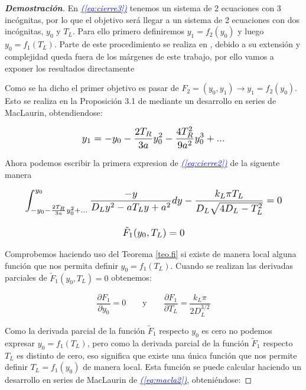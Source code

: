 \documentclass[12pt,a4paper]{report} %
\newcommand{\eref}[1]{\hyperref[#1]{\textcolor{blue}{\textit{(\ref*{#1})}}}}
\begin{document}
\begin{proof}[\textbf{Demostración}]
	\newpage
	
	\vspace{0.5cm}\noindent En \eref{eq:cierre3} tenemos un sistema de 2 ecuaciones con 3 incógnitas, por lo que el objetivo será llegar a un sistema de 2 ecuaciones con dos incógnitas, $y_0$ y $T_L$. Para ello primero definiremos $y_1=f_2(y_0)$ y luego $y_0=f_1(T_L)$. Parte de este procedimiento se realiza en \cite{properties}, debido a su extensión y complejidad queda fuera de los márgenes de este trabajo, por ello vamos a exponer los resultados directamente 
	
	\vspace{0.5cm}Como se ha dicho el primer objetivo es pasar de $F_2=(y_0,y_1) \longrightarrow y_1=f_2(y_0)$. Esto se realiza en la Proposición 3.1 de \cite{properties} mediante un desarrollo en series de MacLaurin, obtendiendose:
	
		\begin{equation}
		\label{eq:macla}
		\scalebox{1.2}{$\displaystyle
			y_1=-y_0-\frac{2T_R}{3a}y_0^2-\frac{4T_R^2}{9a^2}y_0^3+...
			$}
	\end{equation}\smallskip
	
	\vspace{0.5cm}\noindent Ahora podemos escribir la primera expresion de \eref{eq:cierre2} de la siguente manera
	
	\begin{equation}
		\label{eq:macla2}
		\scalebox{1.2}{$\displaystyle
			\begin{gathered}
				\int_{-y_0-\frac{2T_R}{3a}y_0^2+...}^{y_0}\frac{-y}{D_Ly^2-aT_Ly+a^2}dy-\frac{k_L\pi T_L}{D_L\sqrt{4D_L-T_L^2}}=0\\[3mm]
				\tilde{F}_1(y_0,T_L)=0
			\end{gathered}	
			$}
	\end{equation}

	\vspace{0.5cm} Comprobemos haciendo uso del Teorema \ref{teo.fi} si existe de manera local alguna función que nos permita definir $y_0=f_1(T_L)$. Cuando se realizan las derivadas parciales de $\tilde{F}_1(y_0,T_L)=0$ obtenemos:
	
	\begin{equation}
		\label{dpar}
		\frac{\partial F_1}{\partial y_0}=0 \qquad \text{y} \qquad \frac{\partial F_1}{\partial T_L}=\frac{k_L\pi}{2D_L^{3/2}}
	\end{equation}\smallskip
	
	\vspace{0.5cm}\noindent Como la derivada parcial de la función $\tilde{F}_1$ respecto $y_0$ es cero no podemos expresar $y_0=f_1(T_L)$, pero como la derivada parcial de la función $\tilde{F}_1$ respecto $T_L$ es distinto de cero, eso significa que existe una única función que nos permite definir $T_L=f_1(y_0)$ de manera local. Esta función se puede calcular haciendo un desarrollo en series de MacLaurin de \eref{eq:macla2}, obteniéndose:
	

\end{proof}
\end{document}
